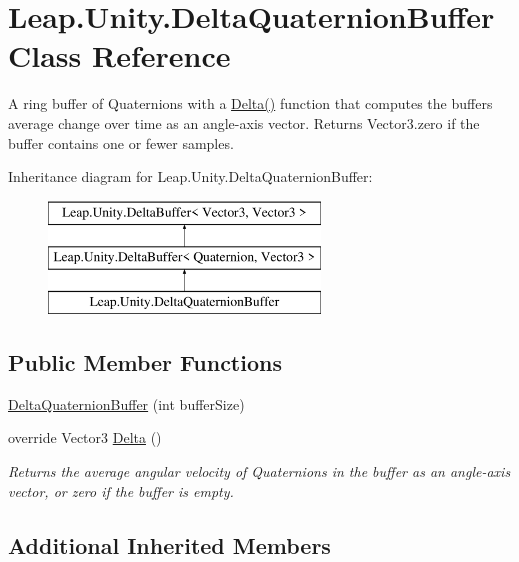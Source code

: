 \hypertarget{class_leap_1_1_unity_1_1_delta_quaternion_buffer}{}\section{Leap.\+Unity.\+Delta\+Quaternion\+Buffer Class Reference}
\label{class_leap_1_1_unity_1_1_delta_quaternion_buffer}


A ring buffer of Quaternions with a \mbox{\hyperlink{class_leap_1_1_unity_1_1_delta_quaternion_buffer_a4e3c9ef1beee10efb295719e81cdf766}{Delta()}} function that computes the buffer\textquotesingle{}s average change over time as an angle-\/axis vector. Returns Vector3.\+zero if the buffer contains one or fewer samples.  


Inheritance diagram for Leap.\+Unity.\+Delta\+Quaternion\+Buffer\+:\begin{figure}[H]
\begin{center}
\leavevmode
\includegraphics[height=3.000000cm]{class_leap_1_1_unity_1_1_delta_quaternion_buffer}
\end{center}
\end{figure}
\subsection*{Public Member Functions}
\begin{DoxyCompactItemize}
\item 
\mbox{\hyperlink{class_leap_1_1_unity_1_1_delta_quaternion_buffer_a8cb7e602d39297195043cc232773f7c9}{Delta\+Quaternion\+Buffer}} (int buffer\+Size)
\item 
override Vector3 \mbox{\hyperlink{class_leap_1_1_unity_1_1_delta_quaternion_buffer_a4e3c9ef1beee10efb295719e81cdf766}{Delta}} ()
\begin{DoxyCompactList}\small\item\em Returns the average angular velocity of Quaternions in the buffer as an angle-\/axis vector, or zero if the buffer is empty. \end{DoxyCompactList}\end{DoxyCompactItemize}
\subsection*{Additional Inherited Members}


